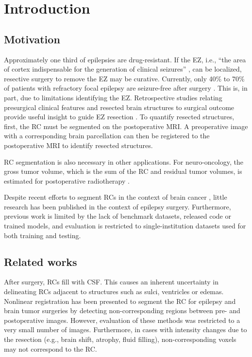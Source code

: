 \section{Introduction}

\subsection{Motivation}

Approximately one third of epilepsies are drug-resistant.
If the \ac{EZ}, i.e., ``the area of cortex indispensable for the generation of clinical seizures'' \cite{rosenow_presurgical_2001}, can be localized, resective surgery to remove the \ac{EZ} may be curative.
Currently, only 40\% to 70\% of patients with refractory focal epilepsy are seizure-free after surgery \cite{jobst_resective_2015}.
This is, in part, due to limitations identifying the \ac{EZ}.
Retrospective studies relating presurgical clinical features and resected brain structures to surgical outcome provide useful insight to guide \ac{EZ} resection \cite{jobst_resective_2015}.
To quantify resected structures, first, the \ac{RC} must be segmented on the postoperative \ac{MRI}.
A preoperative image with a corresponding brain parcellation can then be registered to the postoperative \ac{MRI} to identify resected structures.

\Ac{RC} segmentation is also necessary in other applications.
For neuro-oncology, the gross tumor volume, which is the sum of the \ac{RC} and residual tumor volumes, is estimated for postoperative radiotherapy \cite{ermis_fully_2020}.

Despite recent efforts to segment \acp{RC} in the context of brain cancer \cite{meier_automatic_2017,ermis_fully_2020}, little research has been published in the context of epilepsy surgery.
Furthermore, previous work is limited by the lack of benchmark datasets, released code or trained models, and evaluation is restricted to single-institution datasets used for both training and testing.


\subsection{Related works}

After surgery, \acp{RC} fill with \ac{CSF}.
This causes an inherent uncertainty in delineating \acp{RC} adjacent to structures such as sulci, ventricles or edemas.
Nonlinear registration has been presented to segment the \ac{RC} for epilepsy \cite{chitphakdithai_non-rigid_2010} and brain tumor \cite{chen_deformable_2015} surgeries by detecting non-corresponding regions between pre- and postoperative images.
However, evaluation of these methods was restricted to a very small number of images.
Furthermore, in cases with intensity changes due to the resection (e.g., brain shift, atrophy, fluid filling), non-corresponding voxels may not correspond to the \ac{RC}.

